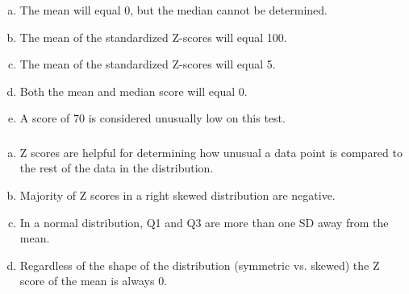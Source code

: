 \documentclass[11pt,containsverbatim,handout,xcolor=xelatex,dvipsnames,table]{beamer}
\newcommand{\solnMult}[1]{#1}
\begin{document}

\begin{frame}
\frametitle{}


\begin{enumerate}[(a)]
\item The mean will equal 0, but the median cannot be determined.
\item The mean of the standardized Z-scores will equal 100.
\item The mean of the standardized Z-scores will equal 5.
\item \solnMult{Both the mean and median score will equal 0.}
\item A score of 70 is considered unusually low on this test.
\end{enumerate}

\end{frame}


\begin{frame}
\frametitle{}

\vfill


\vfill

\end{frame}


\begin{frame}


\begin{enumerate}[(a)]
\item Z scores are helpful for determining how unusual a data point is compared to the rest of the data in the distribution.
\item Majority of Z scores in a right skewed distribution are negative.
\item \solnMult{In a normal distribution, Q1 and Q3 are more than one SD away from the mean.}
\item Regardless of the shape of the distribution (symmetric vs. skewed) the Z score of the mean is always 0.
\end{enumerate}

\end{frame}
\end{document}
